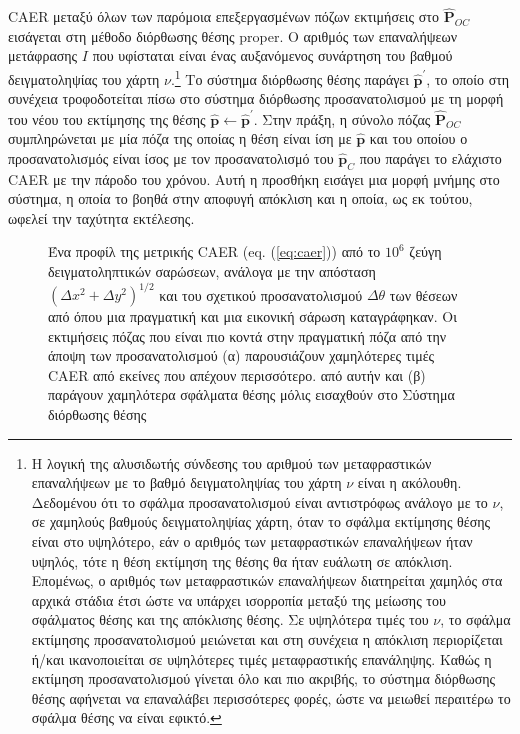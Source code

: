 CAER μεταξύ όλων των παρόμοια επεξεργασμένων πόζων εκτιμήσεις στο
$\hat{\bm{P}}_{OC}$ εισάγεται στη μέθοδο διόρθωσης θέσης proper. Ο αριθμός των
επαναλήψεων μετάφρασης $I$ που υφίσταται είναι ένας αυξανόμενος συνάρτηση του
βαθμού δειγματοληψίας του χάρτη $\nu$.\footnote{Η λογική της αλυσιδωτής
σύνδεσης του αριθμού των μεταφραστικών επαναλήψεων με το βαθμό δειγματοληψίας
του χάρτη $\nu$ είναι η ακόλουθη.  Δεδομένου ότι το σφάλμα προσανατολισμού
είναι αντιστρόφως ανάλογο με το $\nu$, σε χαμηλούς βαθμούς δειγματοληψίας
χάρτη, όταν το σφάλμα εκτίμησης θέσης είναι στο υψηλότερο, εάν ο αριθμός των
μεταφραστικών επαναλήψεων ήταν υψηλός, τότε η θέση εκτίμηση της θέσης θα ήταν
ευάλωτη σε απόκλιση. Επομένως, ο αριθμός των μεταφραστικών επαναλήψεων
διατηρείται χαμηλός στα αρχικά στάδια έτσι ώστε να υπάρχει ισορροπία μεταξύ της
μείωσης του σφάλματος θέσης και της απόκλισης θέσης. Σε υψηλότερα τιμές του
$\nu$, το σφάλμα εκτίμησης προσανατολισμού μειώνεται και στη συνέχεια η
απόκλιση περιορίζεται ή/και ικανοποιείται σε υψηλότερες τιμές μεταφραστικής
επανάληψης.  Καθώς η εκτίμηση προσανατολισμού γίνεται όλο και πιο ακριβής, το
σύστημα διόρθωσης θέσης αφήνεται να επαναλάβει περισσότερες φορές, ώστε να
μειωθεί περαιτέρω το σφάλμα θέσης να είναι εφικτό.} Το σύστημα διόρθωσης θέσης
παράγει $\hat{\bm{p}}^\prime$, το οποίο στη συνέχεια τροφοδοτείται πίσω στο
σύστημα διόρθωσης προσανατολισμού με τη μορφή του νέου του εκτίμησης της θέσης
$\hat{\bm{p}} \leftarrow \hat{\bm{p}}^\prime$. Στην πράξη, η σύνολο πόζας
$\hat{\bm{P}}_{OC}$ συμπληρώνεται με μία πόζα της οποίας η θέση είναι ίση με
$\hat{\bm{p}}$ και του οποίου ο προσανατολισμός είναι ίσος με τον
προσανατολισμό του $\hat{\bm{p}}_C$ που παράγει το ελάχιστο CAER με την πάροδο
του χρόνου. Αυτή η προσθήκη εισάγει μια μορφή μνήμης στο σύστημα, η οποία το
βοηθά στην αποφυγή απόκλιση και η οποία, ως εκ τούτου, ωφελεί την ταχύτητα
εκτέλεσης.


\begin{figure}\hspace{-1cm}
  
  \vspace{1cm}
  \caption{\small Ένα προφίλ της μετρικής CAER (eq. (\ref{eq:caer})) από το
           $10^6$ ζεύγη δειγματοληπτικών σαρώσεων, ανάλογα με την απόσταση
           $(\Delta x^2 + \Delta y^2)^{1/2}$ και του σχετικού προσανατολισμού
           $\Delta \theta$ των θέσεων από όπου μια πραγματική και μια εικονική
           σάρωση καταγράφηκαν. Οι εκτιμήσεις πόζας που είναι πιο κοντά στην
           πραγματική πόζα από την άποψη των προσανατολισμού (α) παρουσιάζουν
           χαμηλότερες τιμές CAER από εκείνες που απέχουν περισσότερο.  από
           αυτήν και (β) παράγουν χαμηλότερα σφάλματα θέσης μόλις εισαχθούν στο
           Σύστημα διόρθωσης θέσης}
  \label{fig:caer}
\end{figure}
